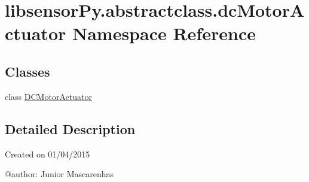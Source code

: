 \hypertarget{namespacelibsensorPy_1_1abstractclass_1_1dcMotorActuator}{}\section{libsensor\+Py.\+abstractclass.\+dc\+Motor\+Actuator Namespace Reference}
\label{namespacelibsensorPy_1_1abstractclass_1_1dcMotorActuator}
\subsection*{Classes}
\begin{DoxyCompactItemize}
\item 
class \hyperlink{classlibsensorPy_1_1abstractclass_1_1dcMotorActuator_1_1DCMotorActuator}{D\+C\+Motor\+Actuator}
\end{DoxyCompactItemize}


\subsection{Detailed Description}
\begin{DoxyVerb}Created on 01/04/2015

@author: Junior Mascarenhas
\end{DoxyVerb}
 